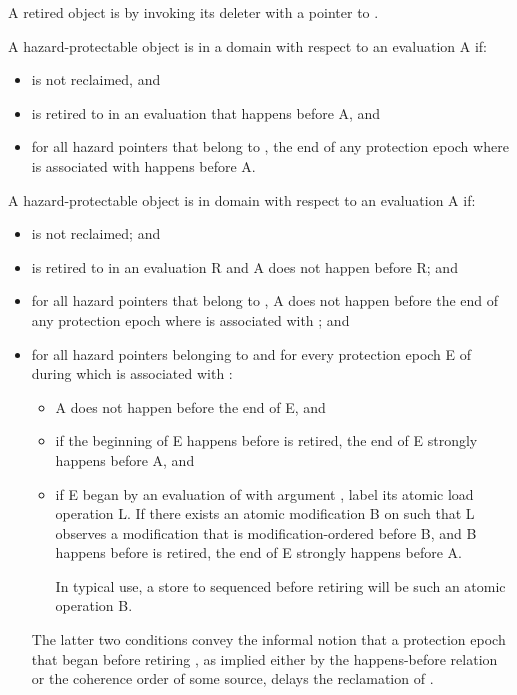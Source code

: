 \pnum
A retired object  is  by invoking its deleter with a pointer to .

\pnum
A hazard-protectable object  is  in a domain  with respect to
an evaluation A if:

\begin{itemize}
\item {} is not reclaimed, and
\item {} is retired to  in an evaluation that happens before A, and
\item for all hazard pointers  that belong to , the end of any protection epoch where  is associated with  happens before A.
\end{itemize}

\pnum
A hazard-protectable object  is  in domain  with respect to an
evaluation A if:
\begin{itemize}
\item {} is not reclaimed; and
\item {} is retired to  in an evaluation R and A does not happen before R; and
\item for all hazard pointers  that belong to , A does not happen before the end of
any protection epoch where  is associated with ; and
\item for all hazard pointers  belonging to  and for every protection epoch E of 
during which  is associated with :
\begin{itemize}
  \item A does not happen before the end of E, and
  \item if the beginning of E happens before  is retired, the end of E strongly
happens before A, and
  \item if E began by an evaluation of  with argument , label its
atomic load operation L. If there exists an atomic modification B on  such that L observes a modification that is modification-ordered before B, and B happens before  is retired, the end of E strongly happens before A. \begin{note} In typical use, a store to  sequenced before retiring  will be such an atomic operation B. \end{note}
\end{itemize}
\begin{note} The latter two conditions convey the informal notion that a protection epoch that began before retiring , as implied either by the happens-before relation or the coherence order of some source, delays the reclamation of . \end{note}
\end{itemize}

